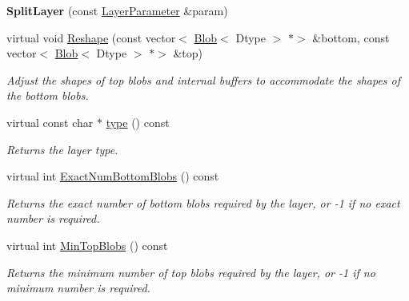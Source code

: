 \begin{DoxyCompactItemize}
\mbox{\label{classcaffe_1_1_split_layer_a784222a81f1921b68bf814fc9dc5d1aa}} 
{\bfseries Split\+Layer} (const \mbox{\hyperlink{classcaffe_1_1_layer_parameter}{Layer\+Parameter}} \&param)
\item 
virtual void \mbox{\hyperlink{classcaffe_1_1_split_layer_a1064977331e5bfcf5d75590d14986e1f}{Reshape}} (const vector$<$ \mbox{\hyperlink{classcaffe_1_1_blob}{Blob}}$<$ Dtype $>$ $\ast$$>$ \&bottom, const vector$<$ \mbox{\hyperlink{classcaffe_1_1_blob}{Blob}}$<$ Dtype $>$ $\ast$$>$ \&top)
\begin{DoxyCompactList}\small\item\em Adjust the shapes of top blobs and internal buffers to accommodate the shapes of the bottom blobs. \end{DoxyCompactList}\item 
\mbox{\label{classcaffe_1_1_split_layer_a69113b39e1f3f1ad83b5765496fcdb35}} 
virtual const char $\ast$ \mbox{\hyperlink{classcaffe_1_1_split_layer_a69113b39e1f3f1ad83b5765496fcdb35}{type}} () const
\begin{DoxyCompactList}\small\item\em Returns the layer type. \end{DoxyCompactList}\item 
virtual int \mbox{\hyperlink{classcaffe_1_1_split_layer_a8ff310ac37e1e79ce6ef8fbc95be0cd9}{Exact\+Num\+Bottom\+Blobs}} () const
\begin{DoxyCompactList}\small\item\em Returns the exact number of bottom blobs required by the layer, or -\/1 if no exact number is required. \end{DoxyCompactList}\item 
virtual int \mbox{\hyperlink{classcaffe_1_1_split_layer_a48dafac272f2f098798e3caa09afbabe}{Min\+Top\+Blobs}} () const
\begin{DoxyCompactList}\small\item\em Returns the minimum number of top blobs required by the layer, or -\/1 if no minimum number is required. \end{DoxyCompactList}\end{DoxyCompactItemize}
